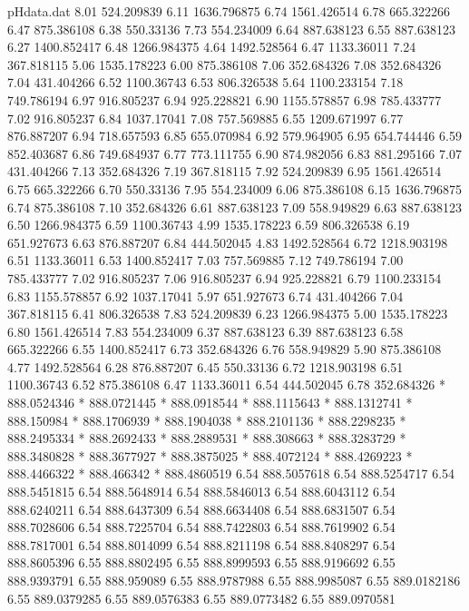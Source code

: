 \begin{filecontents}{pHdata.dat}
8.01 	524.209839
6.11 	1636.796875
6.74 	1561.426514
6.78 	665.322266
6.47 	875.386108
6.38 	550.33136
7.73 	554.234009
6.64 	887.638123
6.55 	887.638123
6.27 	1400.852417
6.48 	1266.984375
4.64 	1492.528564
6.47 	1133.36011
7.24 	367.818115
5.06 	1535.178223
6.00 	875.386108
7.06 	352.684326
7.08 	352.684326
7.04 	431.404266
6.52 	1100.36743
6.53 	806.326538
5.64 	1100.233154
7.18 	749.786194
6.97 	916.805237
6.94 	925.228821
6.90 	1155.578857
6.98 	785.433777
7.02 	916.805237
6.84 	1037.17041
7.08 	757.569885
6.55 	1209.671997
6.77 	876.887207
6.94 	718.657593
6.85 	655.070984
6.92 	579.964905
6.95 	654.744446
6.59 	852.403687
6.86 	749.684937
6.77 	773.111755
6.90 	874.982056
6.83 	881.295166
7.07 	431.404266
7.13 	352.684326
7.19 	367.818115
7.92 	524.209839
6.95 	1561.426514
6.75 	665.322266
6.70 	550.33136
7.95 	554.234009
6.06 	875.386108
6.15 	1636.796875
6.74 	875.386108
7.10 	352.684326
6.61 	887.638123
7.09 	558.949829
6.63 	887.638123
6.50 	1266.984375
6.59 	1100.36743
4.99 	1535.178223
6.59 	806.326538
6.19 	651.927673
6.63 	876.887207
6.84 	444.502045
4.83 	1492.528564
6.72 	1218.903198
6.51 	1133.36011
6.53 	1400.852417
7.03 	757.569885
7.12 	749.786194
7.00 	785.433777
7.02 	916.805237
7.06 	916.805237
6.94 	925.228821
6.79 	1100.233154
6.83 	1155.578857
6.92 	1037.17041
5.97 	651.927673
6.74 	431.404266
7.04 	367.818115
6.41 	806.326538
7.83 	524.209839
6.23 	1266.984375
5.00 	1535.178223
6.80 	1561.426514
7.83 	554.234009
6.37 	887.638123
6.39 	887.638123
6.58 	665.322266
6.55 	1400.852417
6.73 	352.684326
6.76 	558.949829
5.90 	875.386108
4.77 	1492.528564
6.28 	876.887207
6.45 	550.33136
6.72 	1218.903198
6.51 	1100.36743
6.52 	875.386108
6.47 	1133.36011
6.54 	444.502045
6.78 	352.684326
*	888.0524346
*	888.0721445
*	888.0918544
*	888.1115643
*	888.1312741
*	888.150984
*	888.1706939
*	888.1904038
*	888.2101136
*	888.2298235
*	888.2495334
*	888.2692433
*	888.2889531
*	888.308663
*	888.3283729
*	888.3480828
*	888.3677927
*	888.3875025
*	888.4072124
*	888.4269223
*	888.4466322
*	888.466342
*	888.4860519
6.54 	888.5057618
6.54 	888.5254717
6.54 	888.5451815
6.54 	888.5648914
6.54 	888.5846013
6.54 	888.6043112
6.54 	888.6240211
6.54 	888.6437309
6.54 	888.6634408
6.54 	888.6831507
6.54 	888.7028606
6.54 	888.7225704
6.54 	888.7422803
6.54 	888.7619902
6.54 	888.7817001
6.54 	888.8014099
6.54 	888.8211198
6.54 	888.8408297
6.54 	888.8605396
6.55 	888.8802495
6.55 	888.8999593
6.55 	888.9196692
6.55 	888.9393791
6.55 	888.959089
6.55 	888.9787988
6.55 	888.9985087
6.55 	889.0182186
6.55 	889.0379285
6.55 	889.0576383
6.55 	889.0773482
6.55 	889.0970581

\end{filecontents}

